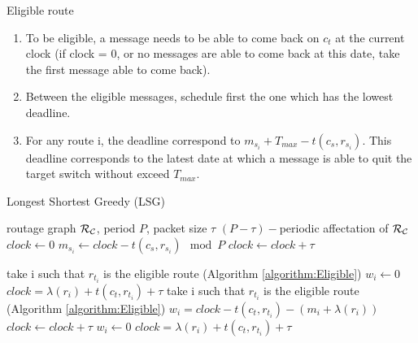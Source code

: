 \documentclass[a4paper,10pt]{article}
\begin{document}
  \begin{algorithm}[H]

    \caption{Eligible route}
    \label{algorithm:Eligible}
    \begin{enumerate}
      
      \item To be eligible, a message needs to be able to come back on $c_t$ at the current clock (if clock = 0, or no messages are able to come back at this date, take the first message able to come back).
      \item Between the eligible messages, schedule first the one which has the lowest deadline.
      \item For any route i, the deadline correspond to $m_{s_i} + T_{max}-t(c_s,r_{s_i})$. This deadline corresponds to the latest date at which a message is able to quit the target switch without exceed $T_{max}$.

      \end{enumerate}
      
  \end{algorithm}
    

     
    \begin{algorithm}[H]
    \caption{Longest Shortest Greedy (LSG)}
    \begin{algorithmic}
    \REQUIRE routage graph ${\cal R_{\cal C}}$, period $P$, packet size $\tau$
    \ENSURE $(P-\tau)-$periodic affectation of ${\cal R_{\cal C}}$
    \STATE $clock \leftarrow 0$
    \STATE  $m_{s_i} \leftarrow clock - t(c_s,r_{s_i}) \mod P$
    \STATE $clock \leftarrow clock + \tau$
    \ENDFOR

    \STATE take i such that $r_{t_i}$ is the eligible route (Algorithm \ref{algorithm:Eligible})
    \STATE $w_i \leftarrow 0$
    \STATE $clock = \lambda(r_i) + t(c_t,r_{t_i}) + \tau$
    \STATE take i such that $r_{t_i}$ is the eligible route (Algorithm \ref{algorithm:Eligible})
    \STATE $w_i = clock - t(c_t,r_{t_i}) - (m_i + \lambda(r_i))$ 
    \STATE $clock \leftarrow clock + \tau$
    \ELSE
    \STATE $w_i \leftarrow 0$
    \STATE $clock = \lambda(r_i) + t(c_t,r_{t_i}) + \tau$
   \ENDIF

    \ENDWHILE

    \end{algorithmic}
    \end{algorithm}
    
\end{document}
